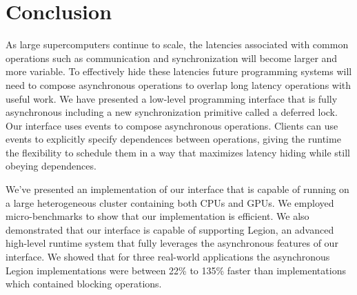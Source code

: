 
\section{Conclusion}
\label{sec:conclusion}

As large supercomputers continue to scale, the latencies associated
with common operations such as communication and synchronization will
become larger and more variable.  To effectively hide these latencies
future programming systems will need to compose asynchronous operations
to overlap long latency operations with useful work.  We have
presented a low-level programming interface that is fully asynchronous
including a new synchronization primitive called a deferred lock.
Our interface uses events to compose asynchronous operations.  Clients
can use events to explicitly specify dependences between operations,
giving the runtime the flexibility to schedule them in a way that maximizes latency 
hiding while still obeying dependences.

We've presented an implementation of our interface that is capable of running
on a large heterogeneous cluster containing both CPUs and GPUs.  We
employed micro-benchmarks to show that our implementation is efficient.
We also demonstrated that our interface is capable of supporting Legion,
an advanced high-level runtime system that fully leverages the asynchronous
features of our interface.  We showed that for three real-world applications
the asynchronous Legion implementations were between 22\% to 135\% faster than
implementations which contained blocking operations.


